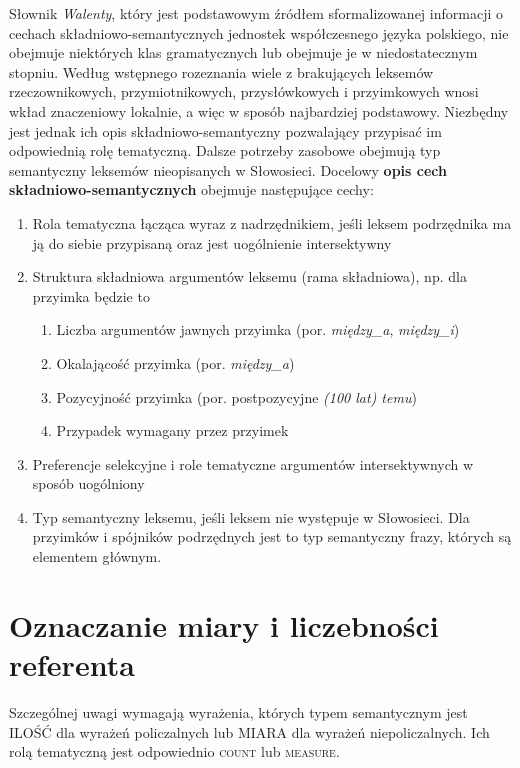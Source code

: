 \documentclass[a4paper, 12pt]{article}
\theoremstyle{remark}
\begin{document}
Słownik \emph{Walenty}, który jest podstawowym źródłem sformalizowanej informacji o cechach składniowo-semantycznych jednostek współczesnego języka polskiego, nie obejmuje niektórych klas gramatycznych lub obejmuje je w niedostatecznym stopniu.
Według wstępnego rozeznania wiele z brakujących leksemów rzeczownikowych, przymiotnikowych, przysłówkowych i przyimkowych wnosi wkład znaczeniowy lokalnie, a więc w sposób najbardziej podstawowy. Niezbędny jest jednak ich opis składniowo-semantyczny pozwalający przypisać im odpowiednią rolę tematyczną.
Dalsze potrzeby zasobowe obejmują typ semantyczny leksemów nieopisanych w Słowosieci.
Docelowy \textbf{opis cech składniowo-semantycznych} obejmuje następujące cechy:

\begin{enumerate}
\item Rola tematyczna łącząca wyraz z nadrzędnikiem, jeśli leksem podrzędnika ma ją do siebie przypisaną oraz jest uogólnienie intersektywny
\item Struktura składniowa argumentów leksemu (rama składniowa), np. dla przyimka będzie to
\begin{enumerate}
\item Liczba argumentów jawnych przyimka (por. \emph{między\_a}, \emph{między\_i})
\item Okalającość przyimka (por. \emph{między\_a})
\item Pozycyjność przyimka (por. postpozycyjne  \emph{(100 lat) temu})
\item Przypadek wymagany przez przyimek
\end{enumerate}

\item Preferencje selekcyjne i role tematyczne argumentów intersektywnych w sposób uogólniony
\item Typ semantyczny leksemu, jeśli leksem nie występuje w Słowosieci. Dla przyimków i spójników podrzędnych jest to typ semantyczny frazy, których są elementem głównym.
\end{enumerate}



\section{Oznaczanie miary i liczebności referenta} %

Szczególnej uwagi wymagają wyrażenia, których typem semantycznym jest \textsf{ILOŚĆ} dla wyrażeń policzalnych lub \textsf{MIARA} dla wyrażeń niepoliczalnych. Ich rolą tematyczną jest odpowiednio \textsc{count} lub \textsc{measure}.
\end{document}
